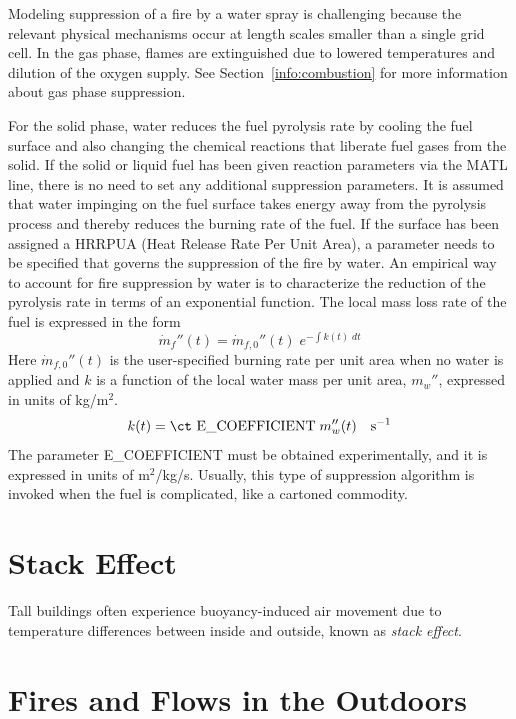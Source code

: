 \documentclass[11pt]{book}
\newcommand{\dm}{\dot{m}}
\newcommand{\be}{\begin{equation}}
\newcommand{\ee}{\end{equation}}
\begin{document}
Modeling suppression of a fire by a water spray is challenging because
the relevant physical mechanisms occur at length scales smaller than a
single grid cell. In the gas phase, flames are extinguished due to lowered
temperatures and dilution of the oxygen supply. See Section~\ref{info:combustion}
for more information about gas phase suppression.

For the solid phase,
water reduces the fuel pyrolysis rate by cooling the fuel surface and also
changing the chemical reactions that liberate fuel gases from the solid.
If the solid or liquid fuel has been given reaction parameters via the {\ct MATL} line, there is no
need to set any additional suppression parameters. It is assumed that
water impinging on the fuel surface takes energy away from the
pyrolysis process and thereby reduces the burning rate of the fuel.
If the surface has been assigned a {\ct HRRPUA} (Heat Release Rate Per Unit Area),
a parameter needs to be specified that governs the suppression of the fire by water.
An empirical way to account for fire suppression by water
is to characterize the reduction of the pyrolysis rate in terms
of an exponential function. The local mass loss rate of the
fuel is expressed in the form
\be \dm_f''(t) = \dm_{f,0}''(t) \; e^{-\int k(t) \; dt} \label{nistexting} \ee
Here $\dm_{f,0}''(t)$ is the user-specified burning rate per unit
area when no water is applied and $k$ is a function of the local water
mass per unit area, $m_w''$, expressed in units of kg/m$^2$.
\be
k(t) = \hbox{\ct E\_COEFFICIENT} \; m_w''(t) \quad          \hbox{s}^{-1}
\ee
The parameter {\ct E\_COEFFICIENT} must be obtained experimentally, and
it is expressed in units of m$^2$/kg/s. Usually, this type of suppression
algorithm is invoked when the fuel is complicated, like a cartoned commodity.



\section{Stack Effect}%
\label{stack}

Tall buildings often experience buoyancy-induced air movement due to temperature differences
between inside and outside, known as {\em stack effect}.


\section{Fires and Flows in the Outdoors}
\end{document}
